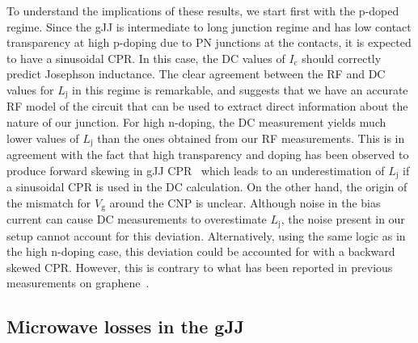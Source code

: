 To understand the implications of these results, we start first with the p-doped regime. 
Since the gJJ is intermediate to long junction regime  and has low contact transparency at high p-doping due to PN junctions at the contacts, it is expected to have a sinusoidal CPR.
In this case, the DC values of $I_\text{c}$ should correctly predict Josephson inductance.
The clear agreement between the RF and DC values for $L_\text{j}$ in this regime is remarkable, and suggests that we have an accurate RF model of the circuit that can be used to extract direct information about the nature of our junction.
For high n-doping, the DC measurement yields much lower values of $L_\text{j}$ than the ones obtained from our RF measurements.
This is in agreement with the fact that high transparency and doping has been observed to produce forward skewing in gJJ CPR~\cite{nandaCurrentPhaseRelationBallistic2017} which leads to an underestimation of $L_\text{j}$ if a sinusoidal CPR is used in the DC calculation.
On the other hand, the origin of the mismatch for $V_\text{g}$ around the CNP is unclear.
Although noise in the bias current can cause DC measurements to overestimate $L_\text{j}$, the noise present in our setup cannot account for this deviation.
Alternatively, using the same logic as in the high n-doping case, this deviation could be accounted for with a backward skewed CPR.
However, this is contrary to what has been reported in previous measurements on graphene~\cite{englishObservationNonsinusoidalCurrentphase2016}.

\subsection{Microwave losses in the gJJ}

